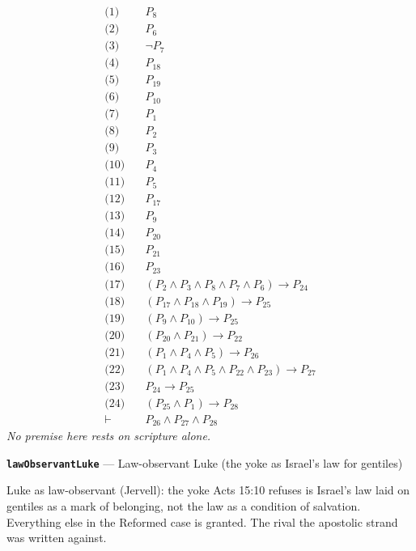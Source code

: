 \documentclass[11pt]{article}
\begin{document}
\begin{align*}
  \text{(1)} \quad & P_{8} \\
  \text{(2)} \quad & P_{6} \\
  \text{(3)} \quad & \lnot P_{7} \\
  \text{(4)} \quad & P_{18} \\
  \text{(5)} \quad & P_{19} \\
  \text{(6)} \quad & P_{10} \\
  \text{(7)} \quad & P_{1} \\
  \text{(8)} \quad & P_{2} \\
  \text{(9)} \quad & P_{3} \\
  \text{(10)} \quad & P_{4} \\
  \text{(11)} \quad & P_{5} \\
  \text{(12)} \quad & P_{17} \\
  \text{(13)} \quad & P_{9} \\
  \text{(14)} \quad & P_{20} \\
  \text{(15)} \quad & P_{21} \\
  \text{(16)} \quad & P_{23} \\
  \text{(17)} \quad & (P_{2} \land P_{3} \land P_{8} \land P_{7} \land P_{6}) \rightarrow P_{24} \\
  \text{(18)} \quad & (P_{17} \land P_{18} \land P_{19}) \rightarrow P_{25} \\
  \text{(19)} \quad & (P_{9} \land P_{10}) \rightarrow P_{25} \\
  \text{(20)} \quad & (P_{20} \land P_{21}) \rightarrow P_{22} \\
  \text{(21)} \quad & (P_{1} \land P_{4} \land P_{5}) \rightarrow P_{26} \\
  \text{(22)} \quad & (P_{1} \land P_{4} \land P_{5} \land P_{22} \land P_{23}) \rightarrow P_{27} \\
  \text{(23)} \quad & P_{24} \rightarrow P_{25} \\
  \text{(24)} \quad & (P_{25} \land P_{1}) \rightarrow P_{28} \\
  \vdash \quad & P_{26} \land P_{27} \land P_{28}
\end{align*}
\emph{No premise here rests on scripture alone.}
\par\medskip\noindent\textbf{\texttt{law\allowbreak{}Observant\allowbreak{}Luke}} --- Law-observant Luke (the yoke as Israel's law for gentiles)\par\nobreak\noindent
Luke as law-observant (Jervell): the yoke Acts 15:10 refuses is Israel's law laid on gentiles as a mark of belonging, not the law as a condition of salvation. Everything else in the Reformed case is granted. The rival the apostolic strand was written against.
\end{document}
